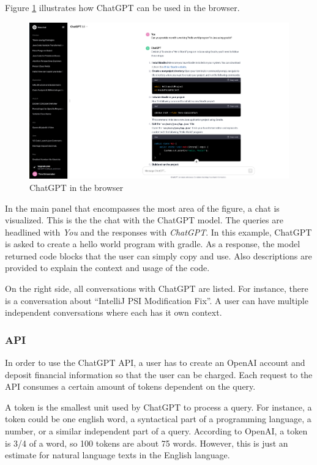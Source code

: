 Figure \ref{fig:chatgpt_browser} illustrates how ChatGPT can be used in the browser.
\begin{figure}
    \centering
\includegraphics[width=\columnwidth]{figures/chapter2/chatgpt_browser.png}
    \caption{ChatGPT in the browser}
    \label{fig:chatgpt_browser}
\end{figure}
In the main panel that encompasses the most area of the figure, a chat is visualized. This is the the chat with the ChatGPT model. The queries are headlined with \textit{You} and the responses with \textit{ChatGPT}. In this example, ChatGPT is asked to create a hello world program with gradle. As a response, the model returned code blocks that the user can simply copy and use. Also descriptions are provided to explain the context and usage of the code.

    On the right side, all conversations with ChatGPT are listed. For instance, there is a conversation about \enquote{IntelliJ PSI Modification Fix}. A user can have multiple independent conversations where each has it own context. 

\subsubsection{API}
In order to use the ChatGPT \ac{API}, a user has to create an OpenAI account and deposit financial information so that the user can be charged. Each request to the API consumes a certain amount of tokens dependent on the query. 

A token is the smallest unit used by ChatGPT to process a query. For instance, a token could be one english word, a syntactical part of a programming language, a number, or a similar independent part of a query. According to OpenAI, a token is 3/4 of a word, so 100 tokens are about 75 words. However, this is just an estimate for natural language texts in the English language. 

